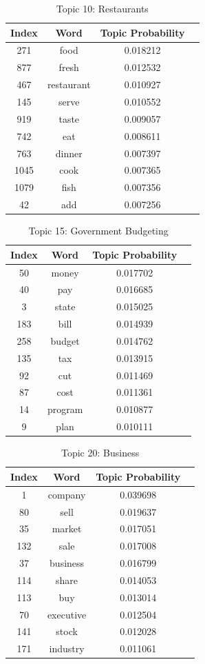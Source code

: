 \documentclass[11pt]{article}
\begin{document}
\begin{table}[!th]
\centering
\begin{tabular}{|c|c|cl}
\hline
Index & Word & Topic Probability \\
\hline
271  & food & 0.018212 \\
877  & fresh & 0.012532 \\
467  & restaurant & 0.010927 \\
145  & serve & 0.010552 \\
919  & taste & 0.009057 \\
742  & eat & 0.008611 \\
763  & dinner & 0.007397 \\
1045 & cook & 0.007365 \\
1079 & fish & 0.007356 \\
42   & add & 0.007256 \\
\hline
\end{tabular}
\caption{Topic 10: Restaurants}
\label{ex:table}
\end{table}

\begin{table}[!th]
\centering
\begin{tabular}{|c|c|cl}
\hline
Index & Word & Topic Probability \\
\hline
50  & money & 0.017702 \\
40  & pay & 0.016685 \\
3   & state & 0.015025 \\
183 & bill & 0.014939 \\
258 & budget & 0.014762 \\
135 & tax & 0.013915 \\
92  & cut & 0.011469 \\
87  & cost & 0.011361 \\
14  & program & 0.010877 \\
9   & plan & 0.010111 \\
\hline
\end{tabular}
\caption{Topic 15: Government Budgeting}
\label{ex:table}
\end{table}

\begin{table}[!th]
\centering
\begin{tabular}{|c|c|cl}
\hline
Index & Word & Topic Probability \\
\hline
1   & company & 0.039698 \\
80  & sell & 0.019637 \\
35  & market & 0.017051 \\
132 & sale & 0.017008 \\
37  & business & 0.016799 \\
114 & share & 0.014053 \\
113 & buy & 0.013014 \\
70  & executive & 0.012504 \\
141 & stock & 0.012028 \\
171 & industry & 0.011061 \\
\hline
\end{tabular}
\caption{Topic 20: Business}
\label{ex:table}
\end{table}
\end{document}

